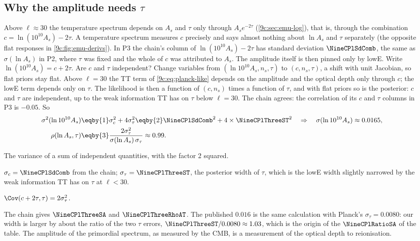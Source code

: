 \subsection{Why the amplitude needs \texorpdfstring{$\tau$}{tau}}
\label{9c:sec:planck-tau}

Above $\ell\approx30$ the temperature spectrum depends on $A_s$ and $\tau$ only through $A_se^{-2\tau}$
(\cref{9c:sec:emu-log}), that is, through the combination $c=\ln(10^{10}A_s)-2\tau$. A temperature spectrum measures
$c$ precisely and says almost nothing about $\ln A_s$ and $\tau$ separately (the opposite flat responses in
\cref{9c:fig:emu-derivs}). In P3 the chain's column of $\ln(10^{10}A_s)-2\tau$ has standard deviation
$\NineCPlSdComb$, the same as $\sigma(\ln A_s)$ in P2, where $\tau$ was fixed and the whole of $c$ was attributed to
$A_s$. The amplitude itself is then pinned only by lowE. Write $\ln(10^{10}A_s)=c+2\tau$. Are $c$ and $\tau$
independent? Change variables from $(\ln10^{10}A_s,n_s,\tau)$ to $(c,n_s,\tau)$, a shift with unit Jacobian, so flat
priors stay flat. Above $\ell=30$ the TT term of \eqref{9c:eq:planck-like} depends on the amplitude and the optical
depth only through $c$; the lowE term depends only on $\tau$. The likelihood is then a function of $(c,n_s)$ times a
function of $\tau$, and with flat priors so is the posterior: $c$ and $\tau$ are independent, up to the weak
information TT has on $\tau$ below $\ell=30$. The chain agrees: the correlation of its $c$ and $\tau$ columns in P3 is
$-0.05$. So
\begin{align}
  \sigma^2(\ln10^{10}A_s)
  &\eqby{1}\sigma_c^2+4\sigma_\tau^2
   \eqby{2}\NineCPlSdComb^2+4\times\NineCPlThreeST^2
   \quad\Rightarrow\quad\sigma(\ln10^{10}A_s)\approx0.0165,
  \nonumber\\
  \rho(\ln A_s,\tau)&\eqby{3}\frac{2\sigma_\tau^2}{\sigma(\ln A_s)\,\sigma_\tau}\approx0.99 .
  \label{9c:eq:As-tau}
\end{align}
\begin{explain}
  \item The variance of a sum of independent quantities, with the factor 2 squared.
  \item $\sigma_c=\NineCPlSdComb$ from the chain; $\sigma_\tau=\NineCPlThreeST$, the posterior width of $\tau$, which
        is the lowE width slightly narrowed by the weak information TT has on $\tau$ at $\ell<30$.
  \item $\Cov(c+2\tau,\tau)=2\sigma_\tau^2$.
\end{explain}
The chain gives $\NineCPlThreeSA$ and $\NineCPlThreeRhoAT$. The published $0.016$ is the same calculation with
Planck's $\sigma_\tau=0.0080$: our width is larger by about the ratio of the two $\tau$ errors, $\NineCPlThreeST/0.0080\approx1.03$,
which is the origin of the $\NineCPlRatioSA$ of the table. The amplitude of the primordial spectrum, as measured by the CMB, is
a measurement of the optical depth to reionisation.

